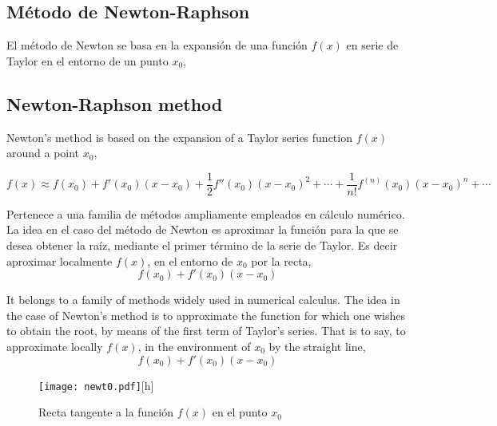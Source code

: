 \begin{paracol}{2}
\subsection{Método de Newton-Raphson}
El método de Newton se basa en la expansión de una función $f(x)$ en serie de Taylor en el entorno de un punto $x_0$,

\switchcolumn
\subsection{Newton-Raphson method}
Newton's method is based on the expansion of a Taylor series function $f(x)$ around a point $x_0$,
\end{paracol}
\begin{equation*}
f(x)\approx f(x_0)+f'(x_0)(x-x_0)+\frac{1}{2}f''(x_0)(x-x_0)^2+\cdots+\frac{1}{n!}f^{(n)}(x_0)(x-x_0)^n+\cdots
\end{equation*}

\begin{paracol}{2}
 Pertenece a una familia de métodos ampliamente empleados en cálculo numérico. La idea en el caso del método de Newton es aproximar la función para la que se desea obtener la raíz, mediante el primer término de la serie de Taylor. Es decir aproximar localmente $f(x)$, en el entorno de $x_0$ por la recta,
\begin{equation*}
 f(x_0)+f'(x_0)(x-x_0)
\end{equation*}

\switchcolumn

 It belongs to a family of methods widely used in numerical calculus. The idea in the case of Newton's method is to approximate the function for which one wishes to obtain the root, by means of the first term of Taylor's series. That is to say, to approximate locally $f(x)$, in the environment of $x_0$ by the straight line,
\begin{equation*}
 f(x_0)+f'(x_0)(x-x_0)
\end{equation*}
\end{paracol}

\begin{figure}[h]
\centering
\texttt{[image: newt0.pdf]}[h]
\caption{Recta tangente a la función $f(x)$ en el punto $x_0$}
\label{fig:newton1}
\end{figure}

